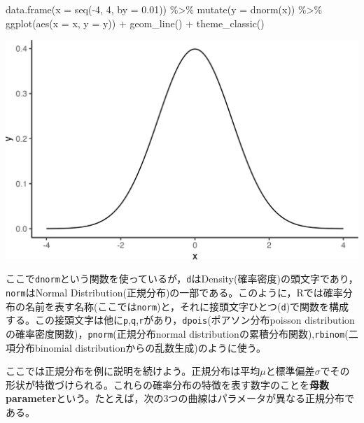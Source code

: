 \documentclass[
  a4paper,
]{ltjsbook}
\newenvironment{Shaded}{\begin{snugshade}}{\end{snugshade}}
\newcommand{\AttributeTok}[1]{\textcolor[rgb]{0.40,0.45,0.13}{#1}}
\newcommand{\DecValTok}[1]{\textcolor[rgb]{0.68,0.00,0.00}{#1}}
\newcommand{\FloatTok}[1]{\textcolor[rgb]{0.68,0.00,0.00}{#1}}
\newcommand{\FunctionTok}[1]{\textcolor[rgb]{0.28,0.35,0.67}{#1}}
\newcommand{\NormalTok}[1]{\textcolor[rgb]{0.00,0.23,0.31}{#1}}
\newcommand{\SpecialCharTok}[1]{\textcolor[rgb]{0.37,0.37,0.37}{#1}}
\begin{document}
\begin{Shaded}
\begin{Highlighting}[]
\FunctionTok{data.frame}\NormalTok{(}\AttributeTok{x =} \FunctionTok{seq}\NormalTok{(}\SpecialCharTok{{-}}\DecValTok{4}\NormalTok{, }\DecValTok{4}\NormalTok{, }\AttributeTok{by =} \FloatTok{0.01}\NormalTok{)) }\SpecialCharTok{\%\textgreater{}\%}
  \FunctionTok{mutate}\NormalTok{(}\AttributeTok{y =} \FunctionTok{dnorm}\NormalTok{(x)) }\SpecialCharTok{\%\textgreater{}\%}
  \FunctionTok{ggplot}\NormalTok{(}\FunctionTok{aes}\NormalTok{(}\AttributeTok{x =}\NormalTok{ x, }\AttributeTok{y =}\NormalTok{ y)) }\SpecialCharTok{+}
  \FunctionTok{geom\_line}\NormalTok{() }\SpecialCharTok{+}
  \FunctionTok{theme\_classic}\NormalTok{()}
\end{Highlighting}
\end{Shaded}

\includegraphics{chapter06_files/figure-pdf/normlByggplot-1.png}

ここで\texttt{dnorm}という関数を使っているが，\texttt{d}はDensity(確率密度)の頭文字であり，\texttt{norm}はNormal
Distribution(正規分布)の一部である。このように，Rでは確率分布の名前を表す名称(ここでは\texttt{norm})と，それに接頭文字ひとつ(\texttt{d})で関数を構成する。この接頭文字は他に\texttt{p},\texttt{q},\texttt{r}があり，\texttt{dpois}(ポアソン分布poisson
distributionの確率密度関数)，\texttt{pnorm}(正規分布normal
distributionの累積分布関数),\texttt{rbinom}(二項分布binomial
distributionからの乱数生成)のように使う。

ここでは正規分布を例に説明を続けよう。正規分布は平均\(\mu\)と標準偏差\(\sigma\)でその形状が特徴づけられる。これらの確率分布の特徴を表す数字のことを\textbf{母数
parameter}という。たとえば，次の3つの曲線はパラメータが異なる正規分布である。
\end{document}
